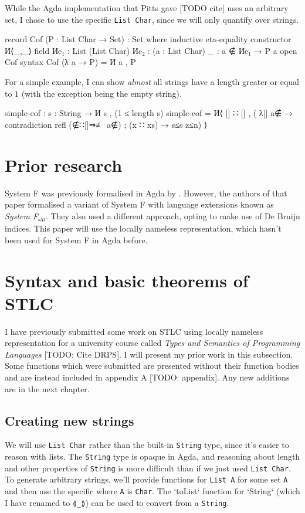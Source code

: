 \documentclass[logo,bsc,singlespacing,parskip,online]{infthesis}
\renewenvironment{code}{\mintedcopy[breaklines,breaksymbolleft=\;]{agda}}{\endmintedcopy}
\begin{document}
While the Agda implementation that Pitts gave [TODO cite] uses an arbitrary set, I chose to use the
specific \texttt{List Char}, since we will only quantify over strings.

\begin{code}
record Cof (P : List Char → Set) : Set where
  inductive
  eta-equality
  constructor И⟨_,_⟩
  field
    Иe₁ : List (List Char)
    Иe₂ : (a : List Char) {_ : a ∉ Иe₁} → P a
open Cof
syntax Cof (λ a → P) = И a , P
\end{code}

For a simple example, I can show \textit{almost} all strings have a length greater or equal to $1$
(with the exception being the empty string).

\begin{code}
simple-cof : {s : String} → И s , (1 ≤ length s)
simple-cof = И⟨ [] ∷ [] , (
  λ{[] {a∉}  → contradiction refl (∉∷[]⇒≢ a∉)
  ; (x ∷ xs) → s≤s z≤n}) ⟩
\end{code}

\section{Prior research}
System F was previously formalised in Agda by \citet{hutton_system_2019}. However, the authors of that paper formalised a
variant of System F with language extensions known as \textit{System F$_{\omega \mu}$}. They also
used a different approach, opting to make use of De Bruijn indices. This paper will use the locally
nameless representation, which hasn't been used for System F in Agda before.

\section{Syntax and basic theorems of STLC}
I have previously submitted some work on STLC using locally nameless representation for a university
course called \textit{Types and Semantics of Programming Languages} [TODO: Cite DRPS]. I will
present my prior work in this subsection. Some functions which were submitted are presented without their
function bodies and are instead included in appendix A [TODO: appendix]. Any new additions are in
the next chapter.

\subsection{Creating new strings}
We will use \texttt{List Char} rather than the built-in \texttt{String} type, since it's easier to
reason with lists. The \texttt{String} type is opaque in Agda, and reasoning about length and other
properties of \texttt{String} is more difficult than if we just used \texttt{List Char}. To generate
arbitrary strings, we'll provide functions for \texttt{List A} for some set \texttt{A} and then use
the specific where \texttt{A} is \texttt{Char}. The `toList` function for `String` (which I have
renamed to \texttt{⟪\_⟫}) can be used to convert from a \texttt{String}.
\end{document}
